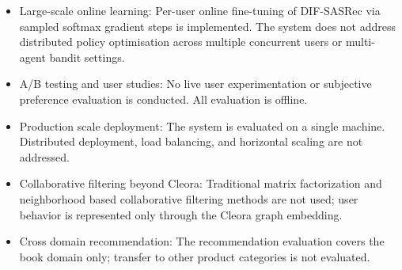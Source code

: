 \begin{itemize}
    \item Large-scale online learning: Per-user online fine-tuning of DIF-SASRec via sampled softmax gradient steps is implemented. The system does not address distributed policy optimisation across multiple concurrent users or multi-agent bandit settings.
    \item A/B testing and user studies: No live user experimentation or subjective preference evaluation is conducted. All evaluation is offline.
    \item Production scale deployment: The system is evaluated on a single machine. Distributed deployment, load balancing, and horizontal scaling are not addressed.
    \item Collaborative filtering beyond Cleora: Traditional matrix factorization and neighborhood based collaborative filtering methods are not used; user behavior is represented only through the Cleora graph embedding.

    \item Cross domain recommendation: The recommendation evaluation covers the book domain only; transfer to other product categories is not evaluated.
\end{itemize}

